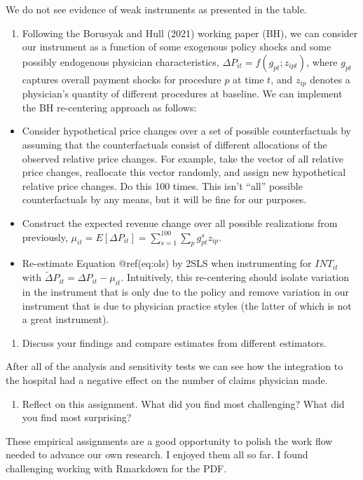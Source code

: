 \documentclass[
  12pt,
]{article}
\providecommand{\tightlist}{%
  \setlength{\itemsep}{0pt}\setlength{\parskip}{0pt}}
\begin{document}
We do not see evidence of weak instruments as presented in the table.

\begin{enumerate}
\def\labelenumi{\arabic{enumi}.}
\setcounter{enumi}{7}
\tightlist
\item
  Following the Borusyak and Hull (2021) working paper (BH), we can
  consider our instrument as a function of some exogenous policy shocks
  and some possibly endogenous physician characteristics,
  \(\Delta P_{it}=f\left(g_{pt}; z_{ipt}\right)\), where \(g_{pt}\)
  captures overall payment shocks for procedure \(p\) at time \(t\), and
  \(z_{ip}\) denotes a physician's quantity of different procedures at
  baseline. We can implement the BH re-centering approach as follows:
\end{enumerate}

\begin{itemize}
\tightlist
\item
  Consider hypothetical price changes over a set of possible
  counterfactuals by assuming that the counterfactuals consist of
  different allocations of the observed relative price changes. For
  example, take the vector of all relative price changes, reallocate
  this vector randomly, and assign new hypothetical relative price
  changes. Do this 100 times. This isn't ``all'' possible
  counterfactuals by any means, but it will be fine for our purposes.
\item
  Construct the expected revenue change over all possible realizations
  from previously,
  \(\mu_{it} = E [\Delta P_{it}]= \sum_{s=1}^{100} \sum_{p} g_{pt}^{s} z_{ip}\).
\item
  Re-estimate Equation @ref(eq:ols) by 2SLS when instrumenting for
  \(INT_{it}\) with
  \(\tilde{\Delta} P_{it} = \Delta P_{it} - \mu_{it}\). Intuitively,
  this re-centering should isolate variation in the instrument that is
  only due to the policy and remove variation in our instrument that is
  due to physician practice styles (the latter of which is not a great
  instrument).
\end{itemize}

\begin{enumerate}
\def\labelenumi{\arabic{enumi}.}
\setcounter{enumi}{8}
\tightlist
\item
  Discuss your findings and compare estimates from different estimators.
\end{enumerate}

After all of the analysis and sensitivity tests we can see how the
integration to the hospital had a negative effect on the number of
claims physician made.

\begin{enumerate}
\def\labelenumi{\arabic{enumi}.}
\setcounter{enumi}{9}
\tightlist
\item
  Reflect on this assignment. What did you find most challenging? What
  did you find most surprising?
\end{enumerate}

These empirical assignments are a good opportunity to polish the work
flow needed to advance our own research. I enjoyed them all so far. I
found challenging working with Rmarkdown for the PDF.
\end{document}
